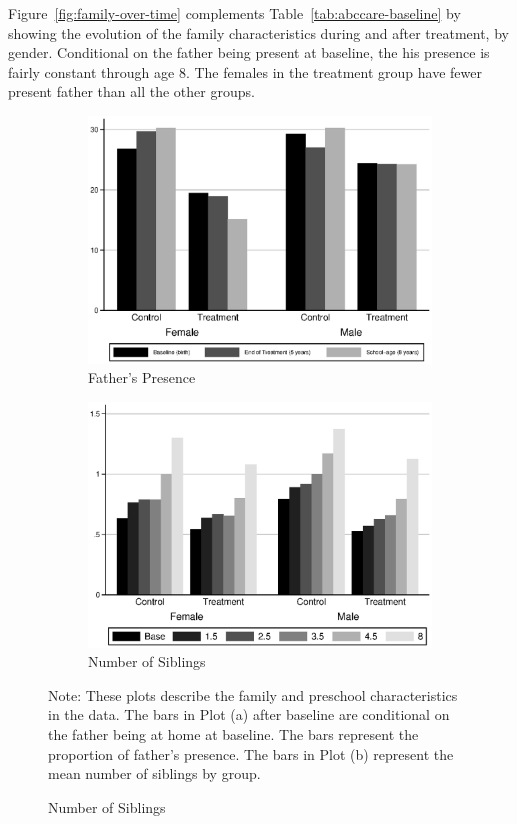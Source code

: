 Figure~\ref{fig:family-over-time} complements Table~\ref{tab:abccare-baseline} by showing the evolution of the family characteristics during and after treatment, by gender. Conditional on the father being present at baseline, the his presence is fairly constant through age 8. The females in the treatment group have fewer present father than all the other groups.

\begin{figure}[H]
\begin{center}
\caption{Family Characteristics Over Time}
\label{fig:family-over-time}
	\begin{subfigure}[b]{0.49\textwidth}
		\centering
		\caption{Father's Presence}
		\label{fig:fhome}
			\includegraphics[width=\textwidth]{../output/family-fhome}
	\end{subfigure}
	\begin{subfigure}[b]{0.49\textwidth}
		\centering
		\caption{Number of Siblings}
		\label{fig:hhsibs}
			\includegraphics[width=\textwidth]{../output/family-hhsibs}
	\end{subfigure}
\end{center}
\raggedright
Note: These plots describe the family and preschool characteristics in the data. The bars in Plot (a) after baseline are conditional on the father being at home at baseline. The bars represent the proportion of father's presence. The bars in Plot (b) represent the mean number of siblings by group.
\end{figure}

